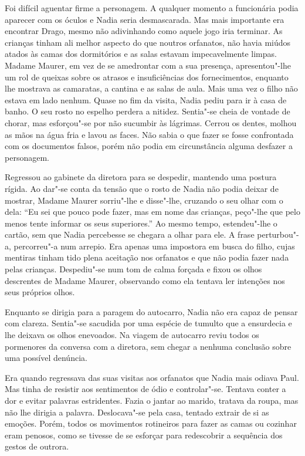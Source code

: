 Foi difícil aguentar firme a personagem. A qualquer momento a
funcionária podia aparecer com os óculos e Nadia seria desmascarada. Mas
mais importante era encontrar Drago, mesmo não adivinhando como aquele
jogo iria terminar. As crianças tinham ali melhor aspecto do que noutros
orfanatos, não havia miúdos atados às camas dos dormitórios e as salas
estavam impecavelmente limpas. Madame Maurer, em vez de se amedrontar
com a sua presença, apresentou"-lhe um rol de queixas sobre os atrasos e
insuficiências dos fornecimentos, enquanto lhe mostrava as camaratas, a
cantina e as salas de aula. Mais uma vez o filho não estava em lado
nenhum. Quase no fim da visita, Nadia pediu para ir à casa de banho. O
seu rosto no espelho perdera a nitidez. Sentia"-se cheia de vontade de
chorar, mas esforçou"-se por não sucumbir às lágrimas. Cerrou os dentes,
molhou as mãos na água fria e lavou as faces. Não sabia o que fazer se
fosse confrontada com os documentos falsos, porém não podia em
circunstância alguma desfazer a personagem.

Regressou ao gabinete da diretora para se despedir,
mantendo uma postura rígida. Ao dar"-se conta da tensão que o rosto de
Nadia não podia deixar de mostrar, Madame Maurer sorriu"-lhe e disse"-lhe,
cruzando o seu olhar com o dela: ``Eu sei que pouco pode fazer, mas em
nome das crianças, peço"-lhe que pelo menos tente informar os seus
superiores.'' Ao mesmo tempo, estendeu"-lhe o cartão, sem que Nadia
percebesse se chegara a olhar para ele. A frase perturbou"-a, percorreu"-a
num arrepio. Era apenas uma impostora em busca do filho, cujas mentiras
tinham tido plena aceitação nos orfanatos e que não podia
fazer nada pelas crianças. Despediu"-se num tom de calma forçada e fixou
os olhos descrentes de Madame Maurer, observando como ela tentava ler
intenções nos seus próprios olhos.

Enquanto se dirigia para a paragem do autocarro, Nadia não era capaz de
pensar com clareza. Sentia"-se sacudida por uma espécie de tumulto que a
ensurdecia e lhe deixava os olhos enevoados. Na viagem de autocarro
reviu todos os pormenores da conversa com a diretora, sem chegar a
nenhuma conclusão sobre uma possível denúncia.

\bigskip

Era quando regressava das suas visitas aos orfanatos que Nadia mais
odiava Paul. Mas tinha de resistir aos sentimentos de ódio e
controlar"-se. Tentava conter a dor e evitar palavras estridentes. Fazia
o jantar ao marido, tratava da roupa, mas não lhe dirigia a palavra.
Deslocava"-se pela casa, tentado extrair de si as emoções. Porém, todos
os movimentos rotineiros para fazer as camas ou cozinhar eram penosos,
como se tivesse de se esforçar para redescobrir a sequência dos gestos
de outrora.

